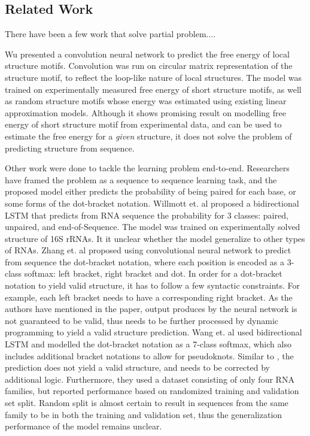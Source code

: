 \documentclass{article}
\begin{document}

\subsection{Related Work}

There have been a few work that solve partial problem....

Wu\cite{wu2018convolutional} presented a convolution neural network to predict the free energy of local structure motifs.
Convolution was run on circular matrix representation of the structure motif, to reflect the loop-like nature of local structures.
The model was trained on experimentally measured free energy of short structure motifs,
as well as random structure motifs whose energy was estimated using existing linear approximation models.
Although it shows promising result on modelling free energy of short structure motif from experimental data,
and can be used to estimate the free energy for a \textit{given} structure,
it does not solve the problem of predicting structure from sequence.

Other work were done to tackle the learning problem end-to-end.
Researchers have framed the problem as a sequence to sequence learning task,
and the proposed model either predicts the probability of being paired for each base,
or some forms of the dot-bracket notation.
Willmott et. al\cite{willmottstate} proposed a bidirectional LSTM that predicts
from RNA sequence the probability for 3 classes: paired, unpaired, and end-of-Sequence.
The model was trained on experimentally solved structure of 16S rRNAs.
It it unclear whether the model generalize to other types of RNAs.
Zhang et. al\cite{zhang2019new} proposed using convolutional neural network to predict from sequence
the dot-bracket notation, where each position is encoded as a 3-class softmax: left bracket, right bracket and dot.
In order for a dot-bracket notation to yield valid structure, it has to follow a few syntactic constraints.
For example, each left bracket needs to have a corresponding right bracket.
As the authors have mentioned in the paper, output produces by the neural network
is not guaranteed to be valid, thus needs to be further processed by dynamic programming
to yield a valid structure prediction.
Wang et. al\cite{wang2019dmfold} used bidirectional LSTM and modelled the dot-bracket notation as a
7-class softmax, which also includes additional bracket notations to allow for pseudoknots.
Similar to \cite{zhang2019new}, the prediction does not yield a valid structure, and needs to be corrected by additional logic.
Furthermore, they used a dataset consisting of only four RNA families,
but reported performance based on randomized training and validation set split.
Random split is almost certain to result in sequences from the same family to be in both the training and validation set,
thus the generalization performance of the model remains unclear.
\end{document}

